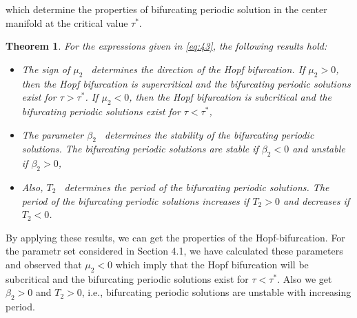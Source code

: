 \documentclass[10pt]{amsart}
\newtheorem{theorem}{Theorem}[section]
\theoremstyle{definition}
\begin{document}
which determine the properties of bifurcating periodic solution in
the center manifold at the critical value $\tau^{*}$.

\begin{theorem}
\label{thm:hop}
For the expressions given in \eqref{eq:43}, the following results hold:
\begin{itemize}
\item The sign of $\mu_{2}$~ determines the direction of the
Hopf bifurcation. If $\mu_{2} > 0$, then the Hopf bifurcation is
supercritical and the bifurcating periodic solutions exist for
$\tau > \tau^{*}$. If $\mu_{2} < 0$, then the Hopf bifurcation
is subcritical and the bifurcating periodic solutions exist for
$\tau < \tau^{*}$,
\item The parameter $\beta_{2}$~ determines the stability of the
bifurcating periodic solutions. The bifurcating periodic solutions
are stable if $\beta_{2} < 0$ and unstable if $\beta_{2} > 0$,
\item  Also, $T_{2}$~ determines the period of the bifurcating periodic
solutions. The period of the bifurcating periodic
solutions increases if $T_{2} > 0$ and decreases if
$T_{2} < 0$.
\end{itemize}
\end{theorem}

By applying these results, we can get the properties of the Hopf-bifurcation. For the parametr set considered in Section 4.1, we have calculated these parameters and observed that $\mu_2<0$ which imply that the Hopf bifurcation will be subcritical and the bifurcating periodic solutions exist for $\tau < \tau^{*}$. Also we get $\beta_2>0$ and $T_2>0$, i.e., bifurcating periodic solutions are unstable with increasing period.
\end{document}
